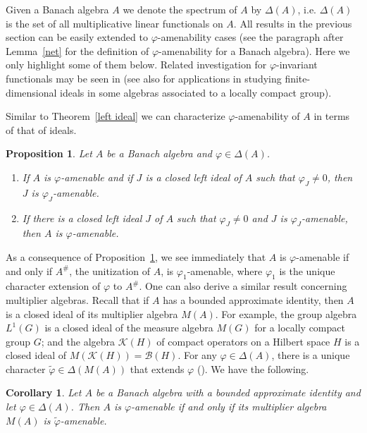\documentclass{tran-l}
\numberwithin{equation}{section}
\newtheorem{prop}[thm]{Proposition}
\newtheorem{cor}[thm]{Corollary}
\theoremstyle{definition}
\theoremstyle{remark}
\begin{document}
Given a Banach algebra $A$ we denote the spectrum of $A$ by $\Delta(A)$, i.e. $\Delta(A)$ is the set of all multiplicative linear functionals on $A$. All results in the previous section can be easily extended to $\varphi$-amenability cases (see the paragraph after Lemma~\ref{net} for the definition of $\varphi$-amenability for a Banach algebra). Here we only highlight some of them below. Related investigation for $\varphi$-invariant functionals may be seen in \cite{Filali92} (see also \cite{B-F, Filali99} for applications in studying finite-dimensional ideals in some algebras associated to a locally compact group). 

Similar to Theorem~\ref{left ideal} we can characterize $\varphi$-amenability of $A$ in terms of that of ideals.

\begin{prop}\label{phi ideal}
Let $A$ be a Banach algebra and $\varphi\in \Delta(A)$.
\begin{enumerate}
\item If $A$ is $\varphi$-amenable and if $J$ is a closed left ideal of $ A$ such that $\varphi_J \neq 0$, then $J$ is $\varphi_J$-amenable.
\item If there is a closed left ideal $J$ of $ A$ such that $\varphi_J \neq 0$ and $J$ is $\varphi_J$-amenable, then $ A$ is $\varphi$-amenable.
\end{enumerate}
\end{prop}

As a consequence of Proposition~\ref{phi ideal}, we see immediately that $A$ is $\varphi$-amenable if and only if $A^\#$, the unitization of $A$, is $\varphi_1$-amenable, where $\varphi_1$ is the unique character extension of $\varphi$ to $A^\#$. One can also derive a similar result concerning multiplier algebras. Recall that if $A$ has a bounded approximate identity, then $A$ is a closed ideal of its multiplier algebra $M(A)$. For example, the group algebra $L^1(G)$ is a closed ideal of the measure algebra $M(G)$ for a locally compact group $G$; and the algebra ${\mathcal{K}}(H)$ of compact operators on a Hilbert space $H$ is a closed ideal of $M({\mathcal{K}}(H))={\mathcal{B}}(H)$. For any $\varphi\in \Delta(A)$, there is a unique character $\tilde\varphi\in \Delta(M(A))$ that extends $\varphi$ (\cite[Proposition~1.4.27]{Dales}). We have the following.
\begin{cor}
Let $A$ be a Banach algebra with a bounded approximate identity and let $\varphi\in \Delta(A)$. Then $A$ is $\varphi$-amenable if and only if its multiplier algebra $M(A)$ is $\tilde\varphi$-amenable.
\end{cor}
\end{document}
